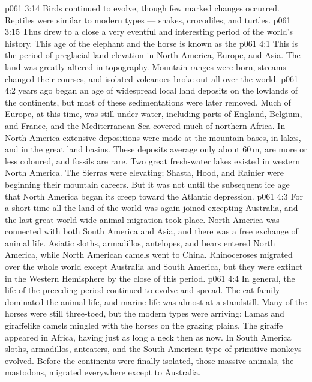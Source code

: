 \vs p061 3:14 Birds continued to evolve, though few marked changes occurred. Reptiles were similar to modern types --- snakes, crocodiles, and turtles.
\vs p061 3:15 \pc Thus drew to a close a very eventful and interesting period of the world’s history. This age of the elephant and the horse is known as the 
\vs p061 4:1 This is the period of preglacial land elevation in North America, Europe, and Asia. The land was greatly altered in topography. Mountain ranges were born, streams changed their courses, and isolated volcanoes broke out all over the world.
\vs p061 4:2 \pc {} years ago began an age of widespread local land deposits on the lowlands of the continents, but most of these sedimentations were later removed. Much of Europe, at this time, was still under water, including parts of England, Belgium, and France, and the Mediterranean Sea covered much of northern Africa. In North America extensive depositions were made at the mountain bases, in lakes, and in the great land basins. These deposits average only about 60\,m, are more or less coloured, and fossils are rare. Two great fresh\hyp{}water lakes existed in western North America. The Sierras were elevating; Shasta, Hood, and Rainier were beginning their mountain careers. But it was not until the subsequent ice age that North America began its creep toward the Atlantic depression.
\vs p061 4:3 For a short time all the land of the world was again joined excepting Australia, and the last great world\hyp{}wide animal migration took place. North America was connected with both South America and Asia, and there was a free exchange of animal life. Asiatic sloths, armadillos, antelopes, and bears entered North America, while North American camels went to China. Rhinoceroses migrated over the whole world except Australia and South America, but they were extinct in the Western Hemisphere by the close of this period.
\vs p061 4:4 In general, the life of the preceding period continued to evolve and spread. The cat family dominated the animal life, and marine life was almost at a standstill. Many of the horses were still three\hyp{}toed, but the modern types were arriving; llamas and giraffelike camels mingled with the horses on the grazing plains. The giraffe appeared in Africa, having just as long a neck then as now. In South America sloths, armadillos, anteaters, and the South American type of primitive monkeys evolved. Before the continents were finally isolated, those massive animals, the mastodons, migrated everywhere except to Australia.

